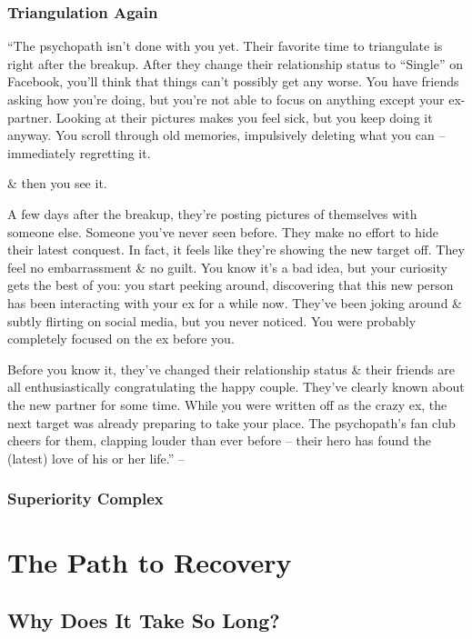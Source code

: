 \documentclass{article}
\numberwithin{equation}{section}
\begin{document}
\subsubsection{Triangulation Again}
``The psychopath isn't done with you yet. Their favorite time to triangulate is right after the breakup. After they change their relationship status to ``Single'' on Facebook, you'll think that things can't possibly get any worse. You have friends asking how you're doing, but you're not able to focus on anything except your ex-partner. Looking at their pictures makes you feel sick, but you keep doing it anyway. You scroll through old memories, impulsively deleting what you can -- immediately regretting it.

\& then you see it.

A few days after the breakup, they're posting pictures of themselves with someone else. Someone you've never seen before. They make no effort to hide their latest conquest. In fact, it feels like they're showing the new target off. They feel no embarrassment \& no guilt. You know it's a bad idea, but your curiosity gets the best of you: you start peeking around, discovering that this new person has been interacting with your ex for a while now. They've been joking around \& subtly flirting on social media, but you never noticed. You were probably completely focused on the ex before you.

Before you know it, they've changed their relationship status \& their friends are all enthusiastically congratulating the happy couple. They've clearly known about the new partner for some time. While you were written off as the crazy ex, the next target was already preparing to take your place. The psychopath's fan club cheers for them, clapping louder than ever before -- their hero has found the (latest) love of his or her life.'' -- \cite[p. 75]{MacKenzie2015}

\subsubsection{Superiority Complex}


\section{The Path to Recovery}

\subsection{Why Does It Take So Long?}
\end{document}
